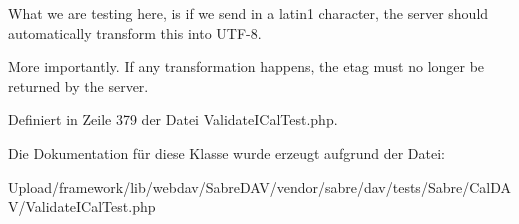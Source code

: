 What we are testing here, is if we send in a latin1 character, the server should automatically transform this into U\+T\+F-\/8.

More importantly. If any transformation happens, the etag must no longer be returned by the server. 

Definiert in Zeile 379 der Datei Validate\+I\+Cal\+Test.\+php.



Die Dokumentation für diese Klasse wurde erzeugt aufgrund der Datei\+:\begin{DoxyCompactItemize}
\item 
Upload/framework/lib/webdav/\+Sabre\+D\+A\+V/vendor/sabre/dav/tests/\+Sabre/\+Cal\+D\+A\+V/Validate\+I\+Cal\+Test.\+php\end{DoxyCompactItemize}
